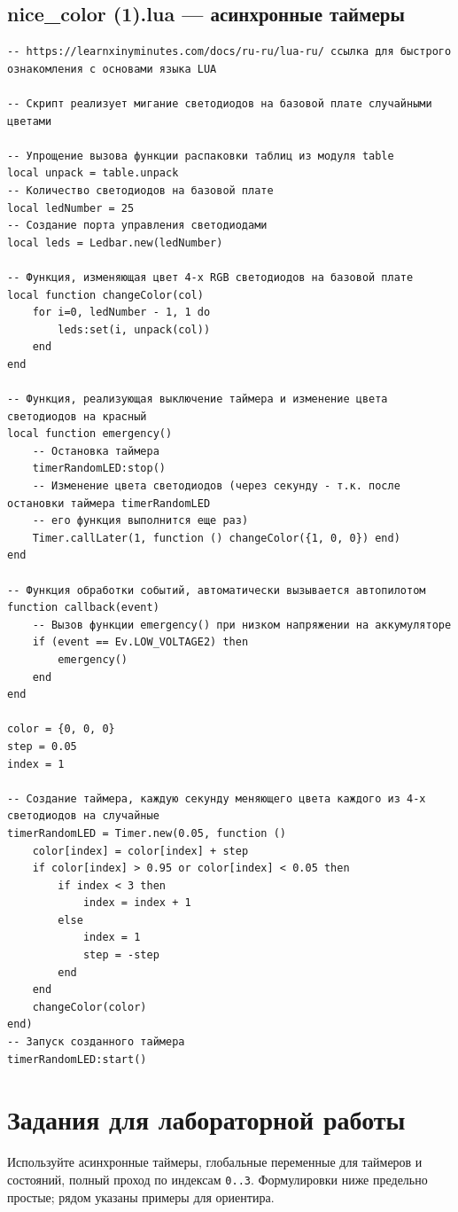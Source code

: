 \documentclass[a4paper,12pt]{article}
\begin{document}
\subsection{nice\_color (1).lua — асинхронные таймеры}
\begin{lstlisting}[style=lua,caption={nice_color (1).lua}]
-- https://learnxinyminutes.com/docs/ru-ru/lua-ru/ ссылка для быстрого ознакомления с основами языка LUA

-- Скрипт реализует мигание светодиодов на базовой плате случайными цветами

-- Упрощение вызова функции распаковки таблиц из модуля table
local unpack = table.unpack
-- Количество светодиодов на базовой плате
local ledNumber = 25
-- Создание порта управления светодиодами
local leds = Ledbar.new(ledNumber)

-- Функция, изменяющая цвет 4-х RGB светодиодов на базовой плате
local function changeColor(col)
    for i=0, ledNumber - 1, 1 do
        leds:set(i, unpack(col))
    end
end

-- Функция, реализующая выключение таймера и изменение цвета светодиодов на красный
local function emergency()
    -- Остановка таймера
    timerRandomLED:stop()
    -- Изменение цвета светодиодов (через секунду - т.к. после остановки таймера timerRandomLED
    -- его функция выполнится еще раз)
    Timer.callLater(1, function () changeColor({1, 0, 0}) end)
end

-- Функция обработки событий, автоматически вызывается автопилотом
function callback(event)
    -- Вызов функции emergency() при низком напряжении на аккумуляторе
    if (event == Ev.LOW_VOLTAGE2) then
        emergency()
    end
end

color = {0, 0, 0} 
step = 0.05 
index = 1

-- Создание таймера, каждую секунду меняющего цвета каждого из 4-х светодиодов на случайные
timerRandomLED = Timer.new(0.05, function ()
    color[index] = color[index] + step
    if color[index] > 0.95 or color[index] < 0.05 then
        if index < 3 then
            index = index + 1
        else
            index = 1
            step = -step
        end
    end
    changeColor(color)
end)
-- Запуск созданного таймера
timerRandomLED:start()
\end{lstlisting}

\section{Задания для лабораторной работы}
Используйте асинхронные таймеры, глобальные переменные для таймеров и состояний, полный проход по индексам \verb|0..3|. Формулировки ниже предельно простые; рядом указаны примеры для ориентира.
\end{document}
